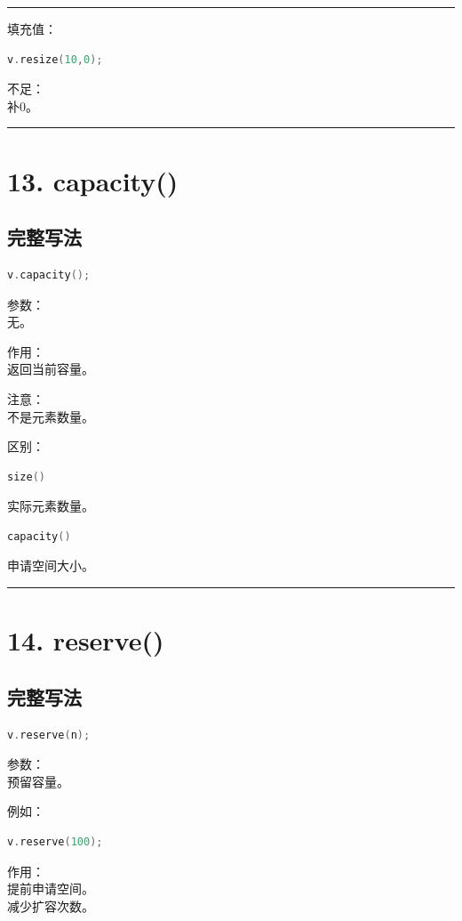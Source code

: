 \documentclass[10pt,twocolumn]{extarticle}
\begin{document}
\noindent\rule{\linewidth}{0.4pt}

填充值：
\begin{lstlisting}[language=C++]
v.resize(10,0);
\end{lstlisting}
不足：\\
补0。

\noindent\rule{\linewidth}{0.4pt}

\section{13. capacity()}

\subsection{完整写法}
\begin{lstlisting}[language=C++]
v.capacity();
\end{lstlisting}
参数：\\
无。

作用：\\
返回当前容量。

注意：\\
不是元素数量。

区别：
\begin{lstlisting}[language=C++]
size()
\end{lstlisting}
实际元素数量。
\begin{lstlisting}[language=C++]
capacity()
\end{lstlisting}
申请空间大小。

\noindent\rule{\linewidth}{0.4pt}

\section{14. reserve()}

\subsection{完整写法}
\begin{lstlisting}[language=C++]
v.reserve(n);
\end{lstlisting}
参数：\\
预留容量。

例如：
\begin{lstlisting}[language=C++]
v.reserve(100);
\end{lstlisting}
作用：\\
提前申请空间。\\
减少扩容次数。
\end{document}
